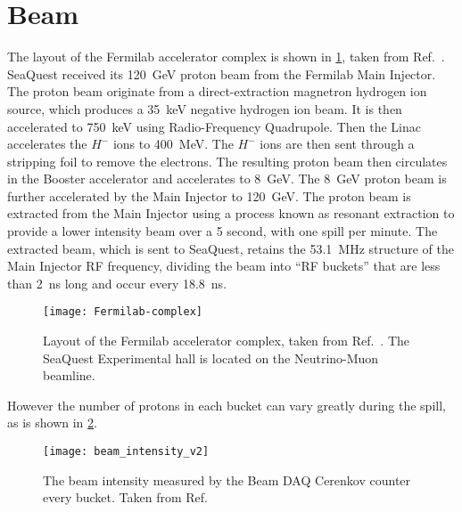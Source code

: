 \documentclass[../main.tex]{subfiles}
\begin{document}
\section{Beam}
The layout of the Fermilab accelerator complex is shown in \cref{fig:complex},
taken from Ref.~\cite{concept-book}.
SeaQuest received its \SI{120}{\GeV} proton beam from the Fermilab Main Injector.
The proton beam originate from a direct-extraction magnetron hydrogen ion source,
which produces a \SI{35}{\keV} negative hydrogen ion beam. It is then accelerated
to \SI{750}{\keV} using Radio-Frequency Quadrupole. Then the Linac accelerates the
$H^-$ ions to \SI{400}{\MeV}. The $H^-$ ions are then sent through a stripping foil
to remove the electrons. The resulting proton beam then circulates in the Booster
accelerator and accelerates to \SI{8}{\GeV}. The \SI{8}{\GeV} proton beam is
further accelerated by the Main Injector to \SI{120}{\GeV}. The proton beam is
extracted from the Main Injector using a process known as resonant extraction to
provide a lower intensity beam over a 5 second, with one spill per minute. The extracted beam, which
is sent to SeaQuest, retains the \SI{53.1}{\MHz} structure of the Main
Injector RF frequency, dividing the beam into ``RF buckets'' that are less than
\SI{2}{\ns} long and occur every \SI{18.8}{\ns}.
\begin{figure}[htbp!]
	\centering
	\texttt{[image: Fermilab-complex]}
	\caption{Layout of the Fermilab accelerator complex, taken from Ref.~\cite{concept-book}. The
		SeaQuest Experimental hall is located on the Neutrino-Muon beamline.}
	\label{fig:complex}
\end{figure}
However the number of protons in each bucket can vary greatly during the spill, as
is shown in \cref{fig:intensity}.
\begin{figure}[htpb!]
	\centering
	\texttt{[image: beam\_intensity\_v2]}
	\caption{The beam intensity measured by the Beam DAQ Cerenkov counter every
		bucket. Taken from Ref.~\cite{aidala2019}}
	\label{fig:intensity}
\end{figure}
\end{document}
